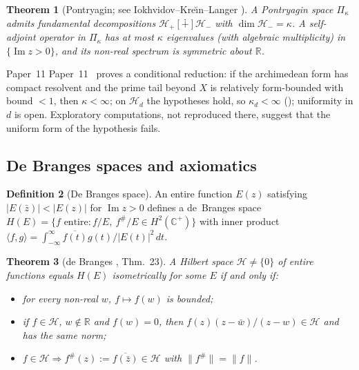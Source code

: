 \documentclass[11pt]{amsart}
\newtheorem{theorem}{Theorem}[section]
\theoremstyle{definition}
\newtheorem{definition}[theorem]{Definition}
\theoremstyle{remark}
\renewcommand{\Im}{\operatorname{Im}}
\newcommand{\kap}{\kappa}
\begin{document}
\begin{theorem}[Pontryagin; see Iokhvidov--Kre\u\i n--Langer \cite{IKL82}]
\label{thm:KL}
A Pontryagin space $\Pi_\kap$ admits fundamental decompositions
$\mathcal H_+[\dotplus]\mathcal H_-$ with $\dim\mathcal H_-=\kap$. A self-adjoint operator
in $\Pi_\kap$ has at most $\kap$ eigenvalues \textup{(}with algebraic multiplicity\textup{)}
in $\{\Im z>0\}$, and its non-real spectrum is symmetric about $\mathbb R$.
\end{theorem}

\begin{nogobox}{Paper~11}
Paper~11~\cite[Prop.~2.1]{P11} proves a conditional reduction: if the archimedean form has
compact resolvent and the prime tail beyond $X$ is relatively form-bounded with bound
$<1$, then $\kap<\infty$; on $\mathcal H_d$ the hypotheses hold, so $\kap_d<\infty$
(\cite[Rem.~2.2]{P11});
uniformity in $d$ is open. Exploratory computations, not reproduced there, suggest that
the uniform form of the hypothesis fails.
\end{nogobox}

\subsection{De Branges spaces and axiomatics}

\begin{definition}[De Branges space]
An entire function $E(z)$ satisfying $|E(\bar z)| < |E(z)|$ for $\Im z > 0$
defines a de~Branges space $H(E) = \{f \text{ entire}: f/E,\ f^\#/E\in H^2(\mathbb{C}^+)\}$
with inner product $\langle f,g\rangle = \int_{-\infty}^\infty \overline{f(t)}g(t)/|E(t)|^2\,dt$.
\end{definition}

\begin{theorem}[de Branges \cite{dB68}, Thm.~23]
A Hilbert space $\mathcal{H}\ne\{0\}$ of entire functions equals $H(E)$ isometrically for
some $E$ if and only if:
\begin{itemize}
  \item[\textup{(dB1)}] for every non-real $w$, $f\mapsto f(w)$ is bounded;
  \item[\textup{(dB2)}] if $f\in\mathcal H$, $w\notin\mathbb R$ and $f(w)=0$, then
    $f(z)(z-\bar w)/(z-w)\in\mathcal H$ and has the same norm;
  \item[\textup{(dB3)}] $f\in\mathcal{H} \Rightarrow
    f^\#(z):=\overline{f(\bar z)}\in\mathcal{H}$ with $\|f^\#\|=\|f\|$.
\end{itemize}
\end{theorem}
\end{document}
